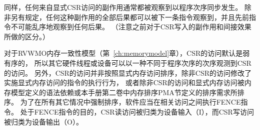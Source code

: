 同样，任何来自显式CSR访问的副作用通常都被观察到以程序次序同步发生。
除非另有规定，任何这种副作用的全部后果都可以被下一条指令观察到，并且先前指令不可能乱序地观察到任何后果。
（注意之前对于CSR写入的副作用和间接效果所做的区分。）

对于RVWMO内存一致性模型（第~\ref{ch:memorymodel}章），CSR的访问默认是弱有序的，
所以其它硬件线程或设备可以以一种不同于程序次序的次序观测到CSR的访问。
另外，CSR的访问并非按照显式内存访问排序，除非CSR的访问修改了实施显式内存访问的指令的执行行为，
或者除非CSR的访问和显式内存访问被内存模型定义的语法依赖或本手册第二卷中内存排序PMA节定义的排序需求所排序。
为了在所有其它情况中强制排序，软件应当在相关访问之间执行FENCE指令。
处于FENCE指令的目的，CSR读访问被归类为设备输入（I），而CSR写访问被归类为设备输出（O）。

